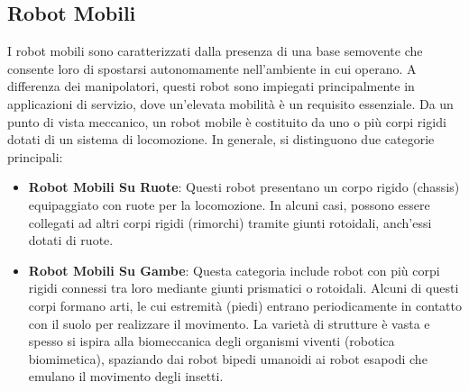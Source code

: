 \documentclass[11pt, a4paper]{report}
\begin{document}

\newpage
\subsection{Robot Mobili}
I robot mobili sono caratterizzati dalla presenza di una base semovente che consente loro di spostarsi autonomamente nell'ambiente in cui operano. A differenza dei manipolatori, questi robot sono impiegati principalmente in applicazioni di servizio, dove un'elevata mobilità è un requisito essenziale. Da un punto di vista meccanico, un robot mobile è costituito da uno o più corpi rigidi dotati di un sistema di locomozione. In generale, si distinguono due categorie principali:


\begin{itemize}
    \item \textbf{Robot Mobili Su Ruote}: Questi robot presentano un corpo rigido (chassis) equipaggiato con ruote per la locomozione. In alcuni casi, possono essere collegati ad altri corpi rigidi (rimorchi) tramite giunti rotoidali, anch'essi dotati di ruote.
    \item \textbf{Robot Mobili Su Gambe}: Questa categoria include robot con più corpi rigidi connessi tra loro mediante giunti prismatici o rotoidali. Alcuni di questi corpi formano arti, le cui estremità (piedi) entrano periodicamente in contatto con il suolo per realizzare il movimento. La varietà di strutture è vasta e spesso si ispira alla biomeccanica degli organismi viventi (robotica biomimetica), spaziando dai robot bipedi umanoidi ai robot esapodi che emulano il movimento degli insetti.
\end{itemize}
\end{document}
